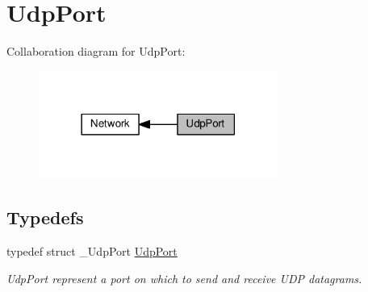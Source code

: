 \hypertarget{group__udp}{}\section{Udp\+Port}
\label{group__udp}
Collaboration diagram for Udp\+Port\+:\nopagebreak
\begin{figure}[H]
\begin{center}
\leavevmode
\includegraphics[width=222pt]{group__udp}
\end{center}
\end{figure}
\subsection*{Typedefs}
\begin{DoxyCompactItemize}
\item 
\mbox{\label{group__udp_ga0c4c532cfe05c936ac56874867ba49e4}} 
typedef struct \+\_\+\+Udp\+Port \hyperlink{group__udp_ga0c4c532cfe05c936ac56874867ba49e4}{Udp\+Port}
\begin{DoxyCompactList}\small\item\em Udp\+Port represent a port on which to send and receive U\+DP datagrams. \end{DoxyCompactList}\end{DoxyCompactItemize}
